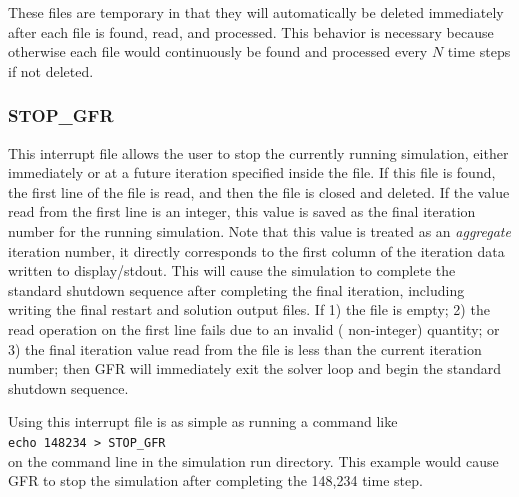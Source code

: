 
These files are temporary in that they will automatically be deleted immediately
after each file is found, read, and processed.
%
This behavior is necessary because otherwise each file would continuously be
found and processed every $N$ time steps if not deleted.


\subsubsection{STOP\_GFR}
\label{SEC:Files:Interrupt:Stop}

This interrupt file allows the user to stop the currently running simulation,
either immediately or at a future iteration specified inside the file.
%
If this file is found, the first line of the file is read, and then the file is
closed and deleted.
%
If the value read from the first line is an integer, this value is saved as the
final iteration number for the running simulation.
%
Note that this value is treated as an \emph{aggregate} iteration number,
\thatis it directly corresponds to the first column of the iteration data
written to display\slash stdout.
%
This will cause the simulation to complete the standard shutdown sequence after
completing the final iteration, including writing the final restart and
solution output files.
%
If
  1) the  file is empty;
  2) the read operation on the first line fails due to an invalid (\thatis
    non-integer) quantity; or
  3) the final iteration value read from the file is less than the current
    iteration number;
%
then GFR will immediately exit the solver loop and begin the standard shutdown
sequence.

\vspace{1.0ex}
\noindent Using this interrupt file is as simple as running a command like
%
\\[1.2ex]\indent\texttt{echo 148234 > STOP\_GFR}\\[1.2ex]
%
%
on the command line in the simulation run directory.
%
This example would cause GFR to stop the simulation after completing the
148,234\supth{} time step.

